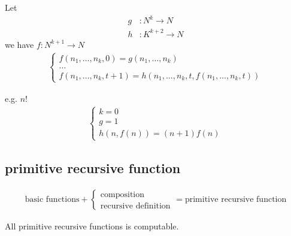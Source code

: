 \begin{definition}
    Let 
    \begin{align*}
        g&:N^k\to N\\
        h&:K^{k+2}\to N
    \end{align*}
    we have $f:N^{k+1}\to N$
    \begin{align*}
        \left\{ \begin{array}{l}
            f(n_1,\dots,n_k,0)=g(n_1,\dots,n_k)\\
            \dots\\
            f(n_1,\dots,n_k,t+1)=h(n_1,\dots,n_k,t,f(n_1,\dots,n_k,t))
        \end{array} \right.
    \end{align*}
\end{definition}

e.g. $n!$
\begin{align*}
    \left\{ \begin{array}{l}
        k=0\\
        g=1\\
        h(n, f(n))=(n+1)f(n)
    \end{array} \right.
\end{align*}

\subsection{primitive recursive function}
\begin{definition}\scriptsize
    \begin{align*}
        \text{basic functions} + \left\{ \begin{array}{l}
            \text{composition}\\
            \text{recursive definition}
        \end{array} \right.=\text{primitive recursive function}
    \end{align*}
\end{definition}
All primitive recursive functions is computable. 

